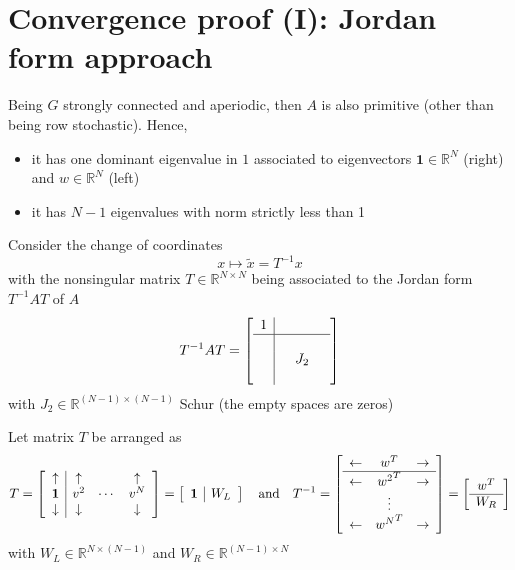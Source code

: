 \documentclass{book}
\newcommand{\R}{\mathbb{R}}
\theoremstyle{theoremv2}
\theoremstyle{defv2}
\theoremstyle{remark}
\theoremstyle{remark}
\theoremstyle{definition}
\theoremstyle{definition}
\begin{document}
\section{Convergence proof (I): Jordan form approach}
Being $G$ strongly connected and aperiodic, then $A$ is also primitive (other than being row stochastic). Hence, 
\begin{itemize}
    \item it has one dominant eigenvalue in $1$ associated to eigenvectors $\boldsymbol{1}\in\R^N$ (right) and $w\in\R^N$ (left)
    \item it has $N-1$ eigenvalues with norm strictly less than 1
\end{itemize}
Consider the change of coordinates 
\[
    x \longmapsto \tilde{x} = T^{-1}x
\]
with the nonsingular matrix $T\in\R^{N\times N}$ being associated to the Jordan form $T^{-1}AT$ of $A$
\[
    T^{-1} A T = \left[\begin{array}{c| c c c }
        1 & & & \\ \hline \\ & & J_2 & \\ & & & 
    \end{array}\right]
\]
with $J_2\in\R^{(N-1) \times (N-1)}$ Schur (the empty spaces are zeros)

Let matrix $T$ be arranged as 
\[
    T = \left[\begin{array}{c | c c c}
        \uparrow & \uparrow & & \uparrow\\ 
        \boldsymbol{1} & v^2 & \cdots & v^N \\
        \downarrow & \downarrow & & \downarrow
    \end{array}\right] = \left[\begin{array}{c | c}
        \boldsymbol{1} & W_L
    \end{array}\right] \quad \text{and} \quad T^{-1} = \left[\begin{array}{c c c}
        \leftarrow &  w^T   &\rightarrow \\ \hline
        \leftarrow &  {w^2}^T   &\rightarrow \\
         &  \vdots   &\\
        \leftarrow &  {w^N}^T   &\rightarrow \\
    \end{array}\right] = \left[\begin{array}{c}
        w^T \\ \hline
        W_R
    \end{array} \right]
\]
with $W_L\in\R^{N\times (N-1)}$ and $W_R\in\R^{(N-1)\times N}$
\end{document}
